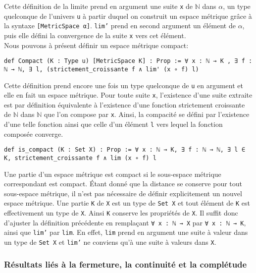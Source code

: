 \documentclass[a4paper, 12pt]{article}
\newcommand{\lean}[1]{\texttt{#1}}
\begin{document}
Cette définition de la limite prend en argument une suite \lean{x} de $\mathbb{N}$ dans $\alpha$, un type quelconque de l'univers \lean{u} à partir duquel on construit un espace métrique grâce à la syntaxe \lean{[MetricSpace α]}. \lean{lim'} prend en second argument un élément de $\alpha$, puis elle défini la convergence de la suite \lean{x} vers cet élément.\\

Nous pouvons à présent définir un espace métrique compact:

\begin{verbatim}
def Compact (K : Type u) [MetricSpace K] : Prop := ∀ x : ℕ → K , ∃ f : ℕ → ℕ, ∃ l, (strictement_croissante f ∧ lim' (x ∘ f) l)
\end{verbatim}

Cette définition prend encore une fois un type quelconque de \lean{u} en argument et elle en fait un espace métrique. Pour toute suite \lean{x}, l'existence d'une suite extraite est par définition équivalente à l'existence d'une fonction strictement croissante de $\mathbb{N}$ dans $\mathbb{N}$ que l'on compose par \lean{x}. Ainsi, la compacité se défini par l'existence d'une telle fonction ainsi que celle d'un élément \lean{l} vers lequel la fonction composée converge.

\begin{verbatim}
def is_compact (K : Set X) : Prop := ∀ x : ℕ → K, ∃ f : ℕ → ℕ, ∃ l ∈ K, strictement_croissante f ∧ lim (x ∘ f) l
\end{verbatim}

Une partie d'un espace métrique est compact si le sous-espace métrique correspondant est compact. Étant donné que la distance se conserve pour tout sous-espace métrique, il n'est pas nécessaire de définir explicitement un nouvel espace métrique. Une partie \lean{K} de \lean{X} est un type de \lean{Set X} et tout élément de \lean{K} est effectivement un type de \lean{X}. Ainsi \lean{K} conserve les propriétés de \lean{X}. Il suffit donc d'ajuster la définition précédente en remplaçant \lean{∀ x : ℕ → X} par \lean{∀ x : ℕ → K}, ainsi que \lean{lim'} par \lean{lim}. En effet, \lean{lim} prend en argument une suite à valeur dans un type de \lean{Set X} et \lean{lim'} ne conviens qu'à une suite à valeurs dans \lean{X}.

\subsubsection{Résultats liés à la fermeture, la continuité et la complétude }
\end{document}

